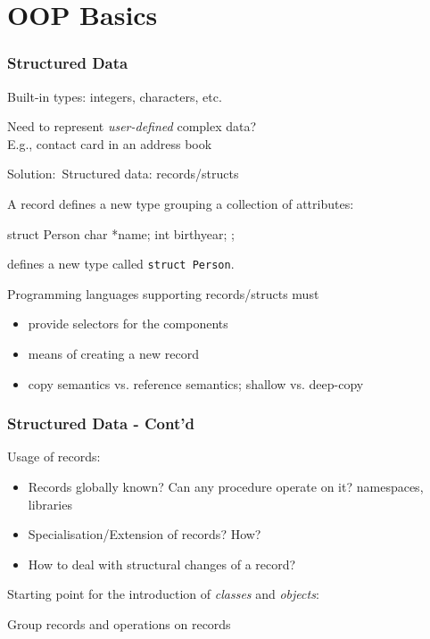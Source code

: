 \documentclass{beamer}
\newcommand{\Blue}[1]{\color{blue}#1\color{black}}
\begin{document}
\section{OOP Basics}
\begin{frame}[fragile]
\frametitle{Structured Data}
\Blue{Built-in types:} integers, characters, etc.

\bigskip

\Blue{Need to represent \emph{user-defined} complex data?}\\
E.g., contact card in an address book

\bigskip

\Blue{Solution:}\ Structured data: records/structs 

A record defines a new type grouping a collection of attributes:

\begin{cplus3}
struct Person {
   char *name;
   int birthyear;
};
\end{cplus3}

defines a new type called \texttt{struct Person}.

Programming languages supporting records/structs must
\begin{itemize}
\item provide selectors for the components
\item means of creating a new record
\item copy semantics vs. reference semantics; shallow vs. deep-copy
\end{itemize}
\end{frame}


\begin{frame}[fragile]
\frametitle{Structured Data - Cont'd}

Usage of records:
\begin{itemize}
  \item Records globally known? Can any procedure operate on it?
    \pause namespaces, libraries
  \item Specialisation/Extension of records? How?
  \item How to deal with structural changes of a record?
\end{itemize}


\pause\bigskip\bigskip

Starting point for the introduction of \emph{classes} and
\emph{objects}:\\
\begin{center}
  Group records and operations on records
\end{center}

\end{frame}
\end{document}
